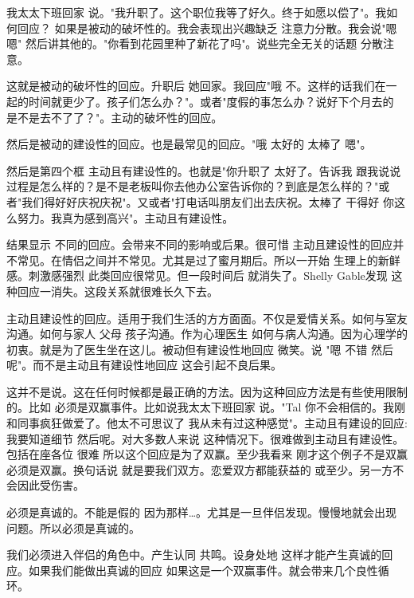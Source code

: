 我太太下班回家 说。"我升职了。这个职位我等了好久。终于如愿以偿了"。我如何回应？ 如果是被动的破坏性的。我会表现出兴趣缺乏 注意力分散。我会说"嗯嗯" 然后讲其他的。"你看到花园里种了新花了吗"。说些完全无关的话题 分散注意。 

这就是被动的破坏性的回应。升职后 她回家。我回应"哦 不。这样的话我们在一起的时间就更少了。孩子们怎么办？"。或者"度假的事怎么办？说好下个月去的 是不是去不了了？"。主动的破坏性的回应。 

然后是被动的建设性的回应。也是最常见的回应。"哦 太好的 太棒了 嗯"。 

然后是第四个框 主动且有建设性的。也就是"你升职了 太好了。告诉我 跟我说说 过程是怎么样的？是不是老板叫你去他办公室告诉你的？到底是怎么样的？"或者"我们得好好庆祝庆祝"。又或者"打电话叫朋友们出去庆祝。太棒了 干得好 你这么努力。我真为感到高兴"。主动且有建设性。 

结果显示 不同的回应。会带来不同的影响或后果。很可惜 主动且建设性的回应并不常见。在情侣之间并不常见。尤其是过了蜜月期后。所以一开始 生理上的新鲜感。刺激感强烈 此类回应很常见。但一段时间后 就消失了。Shelly Gable发现 这种回应一消失。这段关系就很难长久下去。 

主动且建设性的回应。适用于我们生活的方方面面。不仅是爱情关系。如何与室友沟通。如何与家人 父母 孩子沟通。作为心理医生 如何与病人沟通。因为心理学的初衷。就是为了医生坐在这儿。被动但有建设性地回应 微笑。说 "嗯 不错 然后呢"。而不是主动且有建设性地回应 这会引起不良后果。 

这并不是说。这在任何时候都是最正确的方法。因为这种回应方法是有些使用限制的。比如 必须是双赢事件。比如说我太太下班回家 说。"Tal 你不会相信的。我刚和同事疯狂做爱了。他太不可思议了 我从未有过这种感觉"。主动且有建设的回应:我要知道细节 然后呢。对大多数人来说 这种情况下。很难做到主动且有建设性。包括在座各位 很难 所以这个回应是为了双赢。至少我看来 刚才这个例子不是双赢 必须是双赢。换句话说 就是要我们双方。恋爱双方都能获益的 或至少。另一方不会因此受伤害。 

必须是真诚的。不能是假的 因为那样…。尤其是一旦伴侣发现。慢慢地就会出现问题。所以必须是真诚的。 

我们必须进入伴侣的角色中。产生认同 共鸣。设身处地 这样才能产生真诚的回应。如果我们能做出真诚的回应 如果这是一个双赢事件。就会带来几个良性循环。 


